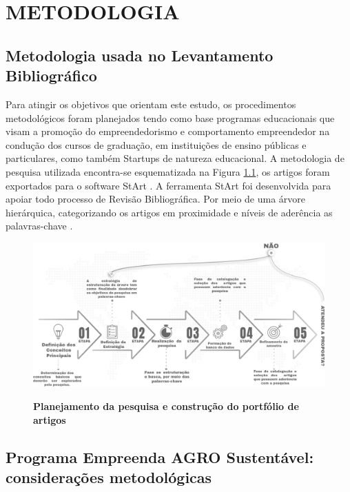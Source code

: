 \chapter{METODOLOGIA}

\section{Metodologia usada no Levantamento Bibliográfico}


Para atingir os objetivos que orientam este estudo, os procedimentos metodológicos foram planejados tendo como base programas educacionais que visam a promoção do empreendedorismo e comportamento empreendedor na condução dos cursos de graduação, em instituições de ensino públicas e particulares, como também Startups de natureza educacional. A metodologia de pesquisa utilizada encontra-se esquematizada na Figura \ref{figura_29}, os artigos foram exportados para o software StArt \cite{lapes_start_2016}. A ferramenta StArt foi desenvolvida para apoiar todo processo de Revisão Bibliográfica. Por meio de uma árvore hierárquica, categorizando os artigos em proximidade e níveis de aderência as palavras-chave \cite{hernandes_avaliacao_2010}. 

\begin{figure}[!htb]
\centering
\caption{\textbf{Planejamento da pesquisa e construção do portfólio de artigos}}
\includegraphics[scale=0.5]{Imagens/fases_pesquisa_bibliografica.png}
\label{figura_29}
\end{figure}






\section{Programa Empreenda AGRO Sustentável: considerações metodológicas}


